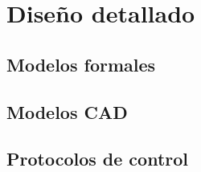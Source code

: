 
\chapter{Diseño detallado}
\label{cap:diseno_detallado}


\section{Modelos formales}
\label{sec:modelos_formales}


\section{Modelos CAD}
\label{sec:modelos_cad}


\section{Protocolos de control}
\label{sec:protocolos_control}

